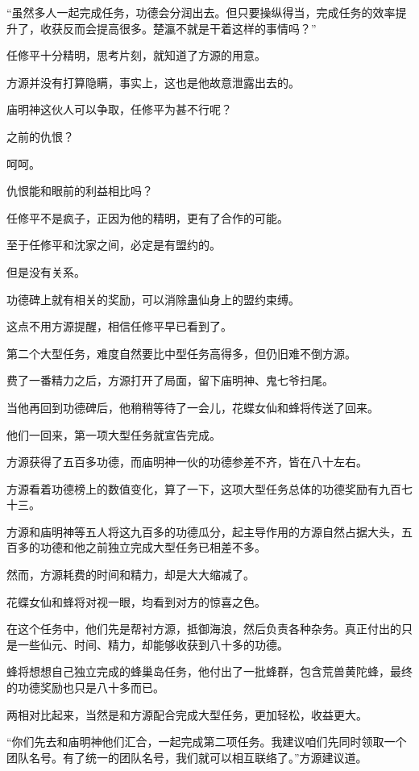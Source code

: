 \begin{this_body}
“虽然多人一起完成任务，功德会分润出去。但只要操纵得当，完成任务的效率提升了，收获反而会提高很多。楚瀛不就是干着这样的事情吗？”

任修平十分精明，思考片刻，就知道了方源的用意。

方源并没有打算隐瞒，事实上，这也是他故意泄露出去的。

庙明神这伙人可以争取，任修平为甚不行呢？

之前的仇恨？

呵呵。

仇恨能和眼前的利益相比吗？

任修平不是疯子，正因为他的精明，更有了合作的可能。

至于任修平和沈家之间，必定是有盟约的。

但是没有关系。

功德碑上就有相关的奖励，可以消除蛊仙身上的盟约束缚。

这点不用方源提醒，相信任修平早已看到了。

第二个大型任务，难度自然要比中型任务高得多，但仍旧难不倒方源。

费了一番精力之后，方源打开了局面，留下庙明神、鬼七爷扫尾。

当他再回到功德碑后，他稍稍等待了一会儿，花蝶女仙和蜂将传送了回来。

他们一回来，第一项大型任务就宣告完成。

方源获得了五百多功德，而庙明神一伙的功德参差不齐，皆在八十左右。

方源看着功德榜上的数值变化，算了一下，这项大型任务总体的功德奖励有九百七十三。

方源和庙明神等五人将这九百多的功德瓜分，起主导作用的方源自然占据大头，五百多的功德和他之前独立完成大型任务已相差不多。

然而，方源耗费的时间和精力，却是大大缩减了。

花蝶女仙和蜂将对视一眼，均看到对方的惊喜之色。

在这个任务中，他们先是帮衬方源，抵御海浪，然后负责各种杂务。真正付出的只是一些仙元、时间、精力，却能够收获到八十多的功德。

蜂将想想自己独立完成的蜂巢岛任务，他付出了一批蜂群，包含荒兽黄陀蜂，最终的功德奖励也只是八十多而已。

两相对比起来，当然是和方源配合完成大型任务，更加轻松，收益更大。

“你们先去和庙明神他们汇合，一起完成第二项任务。我建议咱们先同时领取一个团队名号。有了统一的团队名号，我们就可以相互联络了。”方源建议道。


\end{this_body}
